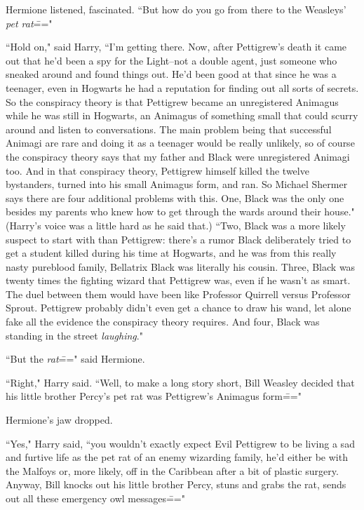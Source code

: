 Hermione listened, fascinated. ``But how do you go from there to the Weasleys' \emph{pet rat}\==="

``Hold on," said Harry, ``I'm getting there. Now, after Pettigrew's death it came out that he'd been a spy for the Light\---not a double agent, just someone who sneaked around and found things out. He'd been good at that since he was a teenager, even in Hogwarts he had a reputation for finding out all sorts of secrets. So the conspiracy theory is that Pettigrew became an unregistered Animagus while he was still in Hogwarts, an Animagus of something small that could scurry around and listen to conversations. The main problem being that successful Animagi are rare and doing it as a teenager would be really unlikely, so of course the conspiracy theory says that my father and Black were unregistered Animagi too. And in that conspiracy theory, Pettigrew himself killed the twelve bystanders, turned into his small Animagus form, and ran. So Michael Shermer says there are four additional problems with this. One, Black was the only one besides my parents who knew how to get through the wards around their house." (Harry's voice was a little hard as he said that.) ``Two, Black was a more likely suspect to start with than Pettigrew: there's a rumor Black deliberately tried to get a student killed during his time at Hogwarts, and he was from this really nasty pureblood family, Bellatrix Black was literally his cousin. Three, Black was twenty times the fighting wizard that Pettigrew was, even if he wasn't as smart. The duel between them would have been like Professor Quirrell versus Professor Sprout. Pettigrew probably didn't even get a chance to draw his wand, let alone fake all the evidence the conspiracy theory requires. And four, Black was standing in the street \emph{laughing}."

``But the \emph{rat}\===" said Hermione.

``Right," Harry said. ``Well, to make a long story short, Bill Weasley decided that his little brother Percy's pet rat was Pettigrew's Animagus form\==="

Hermione's jaw dropped.

``Yes," Harry said, ``you wouldn't exactly expect Evil Pettigrew to be living a sad and furtive life as the pet rat of an enemy wizarding family, he'd either be with the Malfoys or, more likely, off in the Caribbean after a bit of plastic surgery. Anyway, Bill knocks out his little brother Percy, stuns and grabs the rat, sends out all these emergency owl messages\==="

